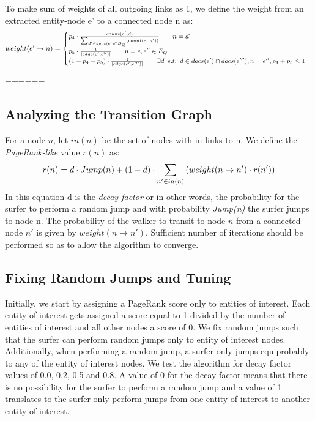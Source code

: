 {To make sum of  weights of all outgoing links as 1, we define the weight from an
extracted entity-node e' to a connected node n as:
\begin{gather}
\small
weight(e' \rightarrow n) = \begin{cases}
    p_4 \cdot \frac{count(e', d)}{\sum_{d' \in docs(e') \cap D_Q}(count(e',d'))} \qquad
    n = d'\\
    p_5 \cdot \frac{1}{|edge(e', e'')|} \qquad n = e, e'' \in E_Q \\
    (1-p_4-p_5) \cdot  \frac{1}{|edge(e', e''')|} \qquad \exists d \enskip s.t. \enskip
    d \in docs(e') \cap docs(e'''), n = e'',p_4 + p_5 \leq 1
\end{cases}
\end{gather}

======}

\subsection*{Analyzing the Transition Graph}
For a node $n$, let $in(n)$ be the set of nodes with in-links to n.
We define the {\em PageRank-like} value $r(n)$ as:
\begin{equation}
\begin{split}
\small
r(n) = d \cdot Jump(n) + (1-d) \cdot \sum_{n' \in in(n)}{(weight(n \rightarrow n') \cdot r(n'))}
\end{split}
\end{equation}
In this equation d is the {\em decay factor} or in other words,
the probability for the surfer to perform a random jump and
with probability {\em Jump(n)} the surfer jumps to node n.
The probability of the walker to transit to node $n$ from a connected
node $n'$ is given by $weight(n \rightarrow n')$.
Sufficient number of iterations should be performed so as to
allow the algorithm to converge.

\subsection*{Fixing Random Jumps and Tuning}
Initially, we start by assigning a PageRank score only to entities of interest. 
Each entity of interest gets assigned a score equal to 1 
divided by the number of entities of interest and all other nodes a score of 0.  
We fix random jumps such that the surfer can perform random jumps only
to entity of interest nodes.
Additionally, when performing a random jump, a surfer only jumps 
equiprobably to any of the entity of interest nodes.
We test the algorithm for decay factor values of 0.0, 0.2, 0.5 and 0.8.
A value of 0 for the decay factor means that there is no possibility
for the surfer to perform a random jump and a value of 1 translates
to the surfer only perform jumps from one entity of interest to another
entity of interest.

